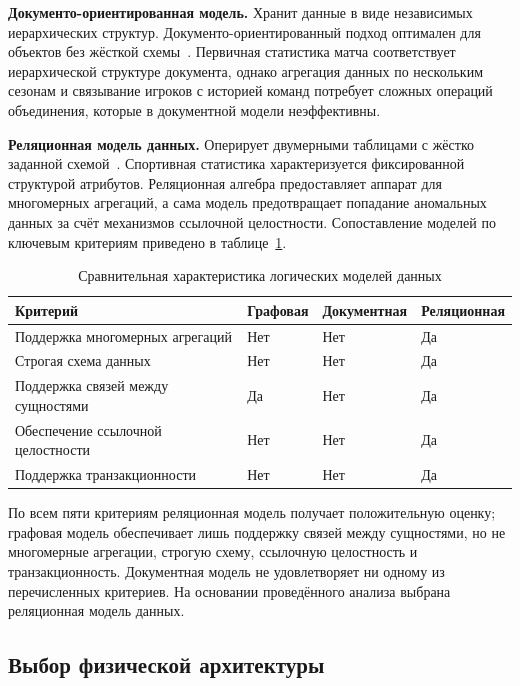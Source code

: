 \textbf{Документо-ориентированная модель.} Хранит данные в виде
независимых иерархических структур. Документо-ориентированный подход
оптимален для объектов без жёсткой схемы~\cite{fowler}. Первичная статистика
матча соответствует иерархической структуре документа, однако агрегация данных по нескольким
сезонам и связывание игроков с историей команд потребует сложных операций
объединения, которые в документной модели неэффективны.

\textbf{Реляционная модель данных.} Оперирует двумерными таблицами
с жёстко заданной схемой~\cite{connolly}. Спортивная статистика
характеризуется фиксированной структурой атрибутов. Реляционная алгебра
предоставляет аппарат для многомерных агрегаций, а сама модель предотвращает
попадание аномальных данных за счёт механизмов ссылочной целостности.
Сопоставление моделей по ключевым критериям приведено
в таблице~\ref{tab:logical-model-compare}.

\begin{table}[H]
\caption{Сравнительная характеристика логических моделей данных}
\label{tab:logical-model-compare}
\centering
\begin{tabularx}{\textwidth}{|>{\RaggedRight\arraybackslash}p{4.8cm}
  |>{\centering\arraybackslash}X
  |>{\centering\arraybackslash}X
  |>{\centering\arraybackslash}X|}
\hline
\textbf{Критерий} & \textbf{Графовая} & \textbf{Документная} & \textbf{Реляционная} \\
\hline
Поддержка многомерных агрегаций & Нет & Нет & Да \\
\hline
Строгая схема данных & Нет & Нет & Да \\
\hline
Поддержка связей между сущностями & Да & Нет & Да \\
\hline
Обеспечение ссылочной целостности & Нет & Нет & Да \\
\hline
Поддержка транзакционности & Нет & Нет & Да \\
\hline
\end{tabularx}
\end{table}

По всем пяти критериям реляционная модель получает положительную
оценку; графовая модель обеспечивает лишь поддержку связей между сущностями,
но не многомерные агрегации, строгую схему, ссылочную целостность
и транзакционность. Документная модель не удовлетворяет ни одному
из перечисленных критериев. На основании проведённого анализа выбрана
реляционная модель данных.

\subsection{Выбор физической архитектуры}

